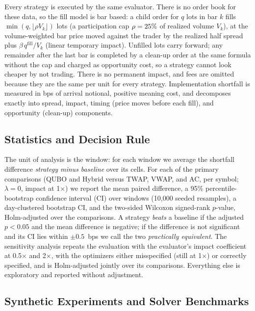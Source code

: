 \documentclass[journal]{IEEEtran}
\begin{document}
Every strategy is executed by the same evaluator. There is no order book for these data, so
the fill model is bar based: a child order for $q$ lots in bar $k$ fills
$\min(q,\lfloor \rho V_k\rfloor)$ lots (a participation cap $\rho=25\%$ of
realized volume $V_k$),
at the volume-weighted bar price moved against the trader by the realized half spread plus
$\beta\,q^{\mathrm{fill}}/V_k$ (linear temporary impact). Unfilled lots carry forward; any
remainder after the last bar is completed by a clean-up order at the same formula without the
cap and charged as opportunity cost, so a strategy cannot look cheaper by not trading. There
is no permanent impact, and fees are omitted because they are the same per unit for every
strategy. Implementation shortfall is measured in bps of arrival notional, positive meaning
cost, and decomposes exactly into spread, impact, timing (price moves before each fill), and
opportunity (clean-up) components.

\subsection{Statistics and Decision Rule}

The unit of analysis is the window: for each window we average the shortfall difference
\emph{strategy minus baseline} over its \NumCells{} cells. For each of the \NumPrimaryComparisons{} primary comparisons
(QUBO and Hybrid versus TWAP, VWAP, and AC, per symbol; $\lambda=0$, impact at 1$\times$) we
report the mean paired difference, a 95\% percentile-bootstrap confidence interval (CI) over
windows (10{,}000 seeded resamples), a day-clustered bootstrap CI, and the two-sided
Wilcoxon signed-rank $p$-value, Holm-adjusted over the \NumPrimaryComparisons{} comparisons. A strategy
\emph{beats} a baseline if the adjusted $p<0.05$ and the mean difference is negative; if the
difference is not significant and its CI lies within $\pm 0.5$~bps we call the two
\emph{practically equivalent}. The sensitivity analysis repeats the evaluation with the
evaluator's impact coefficient at 0.5$\times$ and 2$\times$, with the optimizers either
misspecified (still at 1$\times$) or correctly specified, and is Holm-adjusted jointly over
its \SensNumComparisons{} comparisons. Everything else is exploratory and reported without
adjustment.

\subsection{Synthetic Experiments and Solver Benchmarks}
\end{document}
